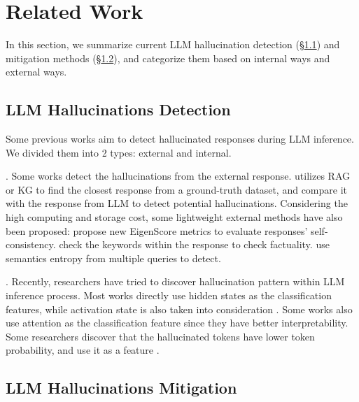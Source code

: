 \section{Related Work}\label{sec:related}

In this section, we summarize current LLM hallucination detection (\S\ref{sec:related:detect}) and mitigation methods (\S\ref{sec:related:mitigate}), and categorize them based on internal ways and external ways.

\subsection{LLM Hallucinations Detection}\label{sec:related:detect}

Some previous works aim to detect hallucinated responses during LLM inference.
We divided them into 2 types: external and internal.

.
Some works detect the hallucinations from the external response.
\cite{niu2024ragtruth, su2024mitigating, hu2024lrp4ragdetecting} utilizes RAG or KG to find the closest response from a ground-truth dataset, and compare it with the response from LLM to detect potential hallucinations.
Considering the high computing and storage cost, some lightweight external methods have also been proposed:
\cite{chen2024inside} propose new EigenScore metrics to evaluate responses' self-consistency.
\cite{zhang2023enhancing, sadat2023delucionqa} check the keywords within the response to check factuality.
\cite{kossen2024semantic} use semantics entropy from multiple queries to detect.

.
Recently, researchers have tried to discover hallucination pattern within LLM inference process.
Most works directly use hidden states\cite{beigi2024internalinspector, chen2024inside, su2024unsupervised, duan2024llms, azaria2023internal} as the classification features, while activation state is also taken into consideration \cite{chen2024context, ji2024llm, he2024llm}.
Some works \cite{chuang2024lookback, yuksekgonul2023attention} also use attention as the classification feature since they have better interpretability.
Some researchers discover that the hallucinated tokens have lower token probability, and use it as a feature \cite{quevedo2024detecting, he2024llm}.

\subsection{LLM Hallucinations Mitigation}\label{sec:related:mitigate}

